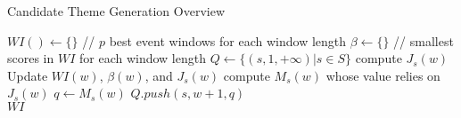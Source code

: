 \begin{algorithm}[t]
\caption{Candidate Theme Generation Overview}
\label{algo:prune_overview}
\begin{algorithmic}[1]
\State $WI() \gets \{\}$ // $p$ best event windows for each window length
\State $\beta \gets \{\}$ // smallest scores in $WI$ for each window length
\State $Q \gets \{(s,1,+\infty) | s \in S\}$
 \label{code:subj_selection}
		\State compute $J_s(w)$	\label{code:v_prune_start}	
		 \label{code:v_prune_end}
			\label{code:e_compute_start}		
				\State Update $WI(w)$, $\beta(w)$, and $J_s(w)$
			\EndFor	\label{code:e_compute_end}
		\EndIf
		\State compute $M_s(w)$ whose value relies on $J_s(w)$\label{code:u_prune_start}
		 \label{code:u_prune_end}
			\State $q \leftarrow M_s(w)$
			\State $Q.push(s,w+1,q)$ \label{code:q_insert}
		\EndIf
\EndWhile \\
\Return $WI$
\end{algorithmic}
\end{algorithm}




